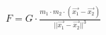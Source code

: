 
$ F = G \cdot \frac{m_{1} \cdot m_{2} \cdot ( \overrightarrow{x_{1}} - \overrightarrow{x_{2}}) } 
{ || \overrightarrow{x_{1}} - \overrightarrow{x_{2}} || ^{3} } $